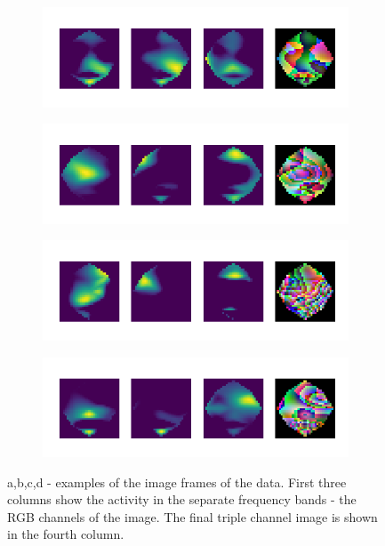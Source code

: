 \documentclass{article}
\begin{document}
\begin{figure}[h!]
 \begin{subfigure}{.5\textwidth}
   \centering
   \includegraphics[width=1\linewidth]{2_cropped.png}
   \caption{}
 \end{subfigure}
 \begin{subfigure}{.5\textwidth}
   \centering
   \includegraphics[width=1\linewidth]{4_cropped.png}
   \caption{}
 \end{subfigure}
 \begin{subfigure}{.5\textwidth}
   \centering
   \includegraphics[width=1\linewidth]{6_cropped.png}
   \caption{}
 \end{subfigure}
 \begin{subfigure}{.5\textwidth}
   \centering
   \includegraphics[width=1\linewidth]{9_cropped.png}
   \caption{}
 \end{subfigure}
 \caption{a,b,c,d - examples of the image frames of the data. First three columns show the activity in the separate frequency bands - the RGB channels of the image. The final triple channel image is shown in the fourth column.}
\end{figure}
\end{document}

